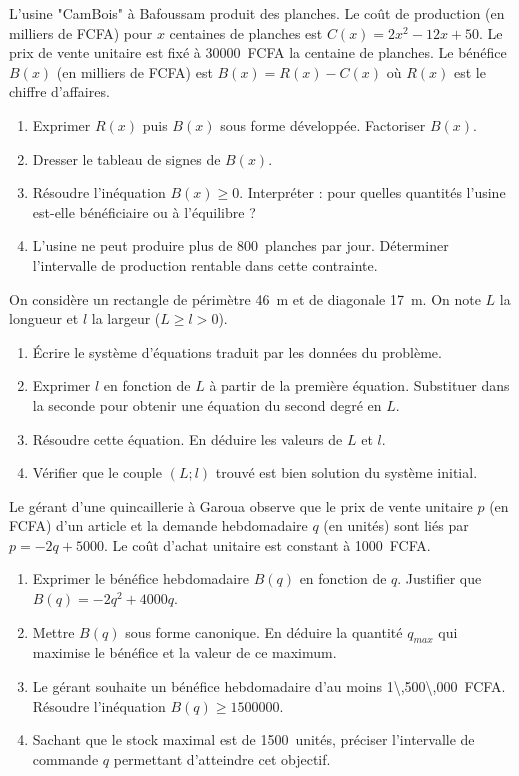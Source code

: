 \documentclass[11pt]{article}
\begin{document}
\begin{exercice}
L'usine "CamBois" à Bafoussam produit des planches. Le coût de production (en milliers de FCFA) pour $x$ centaines de planches est $C(x) = 2x^2 - 12x + 50$. Le prix de vente unitaire est fixé à \SI{30000}{FCFA} la centaine de planches. Le bénéfice $B(x)$ (en milliers de FCFA) est $B(x) = R(x) - C(x)$ où $R(x)$ est le chiffre d'affaires.
\begin{enumerate}
    \item Exprimer $R(x)$ puis $B(x)$ sous forme développée. Factoriser $B(x)$.
    \item Dresser le tableau de signes de $B(x)$.
    \item Résoudre l'inéquation $B(x) \geq 0$. Interpréter : pour quelles quantités l'usine est-elle bénéficiaire ou à l'équilibre ?
    \item L'usine ne peut produire plus de \SI{800}{planches} par jour. Déterminer l'intervalle de production rentable dans cette contrainte.
\end{enumerate}
\end{exercice}

\begin{exercice}
On considère un rectangle de périmètre \SI{46}{m} et de diagonale \SI{17}{m}. On note $L$ la longueur et $l$ la largeur ($L \geq l > 0$).
\begin{enumerate}
    \item Écrire le système d'équations traduit par les données du problème.
    \item Exprimer $l$ en fonction de $L$ à partir de la première équation. Substituer dans la seconde pour obtenir une équation du second degré en $L$.
    \item Résoudre cette équation. En déduire les valeurs de $L$ et $l$.
    \item Vérifier que le couple $(L; l)$ trouvé est bien solution du système initial.
\end{enumerate}
\end{exercice}

\begin{exercice}
Le gérant d'une quincaillerie à Garoua observe que le prix de vente unitaire $p$ (en FCFA) d'un article et la demande hebdomadaire $q$ (en unités) sont liés par $p = -2q + 5000$. Le coût d'achat unitaire est constant à \SI{1000}{FCFA}.
\begin{enumerate}
    \item Exprimer le bénéfice hebdomadaire $B(q)$ en fonction de $q$. Justifier que $B(q) = -2q^2 + 4000q$.
    \item Mettre $B(q)$ sous forme canonique. En déduire la quantité $q_{max}$ qui maximise le bénéfice et la valeur de ce maximum.
    \item Le gérant souhaite un bénéfice hebdomadaire d'au moins \SI{1\,500\,000}{FCFA}. Résoudre l'inéquation $B(q) \geq 1500000$.
    \item Sachant que le stock maximal est de \SI{1500}{unités}, préciser l'intervalle de commande $q$ permettant d'atteindre cet objectif.
\end{enumerate}
\end{exercice}
\end{document}
